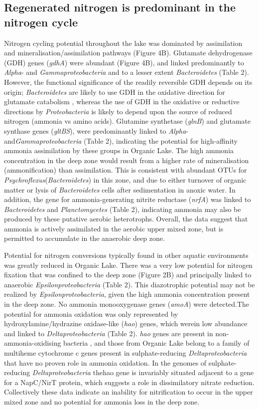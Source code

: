 \subsection{Regenerated nitrogen is predominant in the nitrogen cycle}
Nitrogen cycling potential throughout the lake was dominated by assimilation and mineralisation/assimilation pathways (Figure 4B). 
Glutamate dehydrogenase (GDH) genes (\emph{gdhA}) were abundant (Figure 4B), and linked predominantly to \emph{Alpha}- and \emph{Gammaproteobacteria} and to a lesser extent \emph{Bacteroidetes} (Table 2). 
However, the functional significance of the readily reversible GDH depends on its origin; \emph{Bacteroidetes} are likely to use GDH in the oxidative direction for glutamate catabolism \cite{Williams2012}, whereas the use of GDH in the oxidative or reductive directions by \emph{Proteobacteria} is likely to depend upon the source of reduced nitrogen (ammonia vs amino acids). 
Glutamine synthetase (\emph{glnB}) and glutamate synthase genes (\emph{gltBS}), were predominantly linked to \emph{Alpha}- and\emph{Gammaproteobacteria} (Table 2), indicating the potential for high-affinity ammonia assimilation by these groups in Organic Lake. 
The high ammonia concentration in the deep zone  would result from a higher rate of mineralisation (ammonification) than assimilation. 
This is consistent with abundant \acp{OTU} for \emph{Psychroflexus}(\emph{Bacteroidetes}) in this zone, and due to either turnover of organic matter or lysis of \emph{Bacteroidetes} cells after sedimentation in anoxic water. 
In addition, the gene for ammonia-generating nitrite reductase (\emph{nrfA}) was linked to \emph{Bacteroidetes} and \emph{Planctomycetes} (Table 2), indicating ammonia may also be produced by these putative aerobic heterotrophs. 
Overall, the data suggest that ammonia is actively assimilated in the aerobic upper mixed zone, but is permitted to accumulate in the anaerobic deep zone.

Potential for nitrogen conversions typically found in other aquatic environments was greatly reduced in Organic Lake. 
There was a very low potential for nitrogen fixation that was confined to the deep zone (Figure 2B) and principally linked to anaerobic \emph{Epsilonproteobacteria} (Table 2). 
This diazotrophic potential may not be realized by \emph{Epsilonproteobacteria}, given the high ammonia concentration present in the deep zone. 
No ammonia monooxygenase genes (\emph{amoA}) were detected.The potential for ammonia oxidation was only represented by hydroxylamine/hydrazine oxidase-like (\emph{hao}) genes, which werein low abundance and linked to \emph{Deltaproteobacteria} (Table 2). 
\emph{hao} genes are present in non-ammonia-oxidising bacteria \cite{Bergmann2005}, and those from Organic Lake belong to a family of multiheme cytochrome c genes present in sulphate-reducing \emph{Deltaproteobacteria} that have no proven role in ammonia oxidation. 
In the genomes of sulphate-reducing \emph{Deltaproteobacteria} thehao gene is invariably situated adjacent to a gene for a NapC/NirT protein, which suggests a role in dissimilatory nitrate reduction. 
Collectively these data indicate an inability for nitrification to occur in the upper mixed zone and no potential for ammonia loss in the deep zone.

